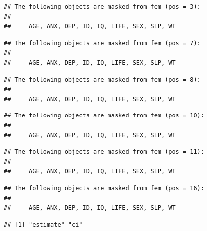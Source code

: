 \documentclass[12pt,a4paper]{book}
\newenvironment{Shaded}{\begin{snugshade}}{\end{snugshade}}
\newcommand{\KeywordTok}[1]{\textcolor[rgb]{0.13,0.29,0.53}{\textbf{#1}}}
\newcommand{\DataTypeTok}[1]{\textcolor[rgb]{0.13,0.29,0.53}{#1}}
\newcommand{\DecValTok}[1]{\textcolor[rgb]{0.00,0.00,0.81}{#1}}
\newcommand{\StringTok}[1]{\textcolor[rgb]{0.31,0.60,0.02}{#1}}
\newcommand{\OtherTok}[1]{\textcolor[rgb]{0.56,0.35,0.01}{#1}}
\newcommand{\OperatorTok}[1]{\textcolor[rgb]{0.81,0.36,0.00}{\textbf{#1}}}
\newcommand{\NormalTok}[1]{#1}
\theoremstyle{definition}
\theoremstyle{definition}
\theoremstyle{definition}
\theoremstyle{remark}
\begin{document}
\begin{Shaded}
\end{Shaded}

\begin{verbatim}
## The following objects are masked from fem (pos = 3):
## 
##     AGE, ANX, DEP, ID, IQ, LIFE, SEX, SLP, WT
\end{verbatim}

\begin{verbatim}
## The following objects are masked from fem (pos = 7):
## 
##     AGE, ANX, DEP, ID, IQ, LIFE, SEX, SLP, WT
\end{verbatim}

\begin{verbatim}
## The following objects are masked from fem (pos = 8):
## 
##     AGE, ANX, DEP, ID, IQ, LIFE, SEX, SLP, WT
\end{verbatim}

\begin{verbatim}
## The following objects are masked from fem (pos = 10):
## 
##     AGE, ANX, DEP, ID, IQ, LIFE, SEX, SLP, WT
\end{verbatim}

\begin{verbatim}
## The following objects are masked from fem (pos = 11):
## 
##     AGE, ANX, DEP, ID, IQ, LIFE, SEX, SLP, WT
\end{verbatim}

\begin{verbatim}
## The following objects are masked from fem (pos = 16):
## 
##     AGE, ANX, DEP, ID, IQ, LIFE, SEX, SLP, WT
\end{verbatim}

\begin{verbatim}
## [1] "estimate" "ci"
\end{verbatim}
\end{document}
